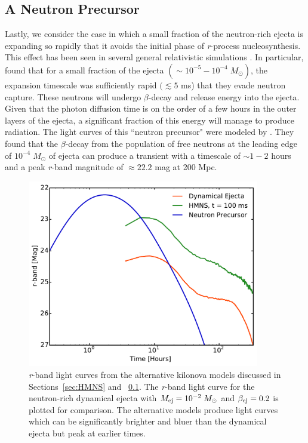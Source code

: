 \subsection{A Neutron Precursor}
\label{sec:neutronpre}
Lastly, we consider the case in which a small fraction of the neutron-rich ejecta is expanding so rapidly that it avoids the initial phase of {\em r}-process nucleosynthesis. This effect has been seen in several general relativistic simulations \citep{Bauswein+13b,Goriely+14,Just+14}. In particular, \citet{Bauswein+13b} found that for a small fraction of the ejecta $(\sim 10^{-5} - 10^{-4}\; M_{\odot})$, the expansion timescale was sufficiently rapid $(\lesssim 5$ ms) that they evade neutron capture. These neutrons will undergo $\beta$-decay and release energy into the ejecta. Given that the photon diffusion time is on the order of a few hours in the outer layers of the ejecta, a significant fraction of this energy will manage to produce radiation. The light curves of this ``neutron precursor" were modeled by \citet{Metzger+15}. They found that the $\beta$-decay from the population of free neutrons at the leading edge of $10^{-4}\;M_{\odot}$ of ejecta can produce a transient with a timescale of $\sim1-2$ hours and a peak {\em r}-band magnitude of $\approx 22.2$ mag at 200 Mpc.

\begin{figure}[h!]
\centering
\includegraphics[width=0.9\textwidth]{./figs/chapter2/ch2_f18.pdf}
\caption{{\em r}-band light curves from the alternative kilonova models discussed in Sections~\ref{sec:HMNS} and ~\ref{sec:neutronpre}. The {\em r}-band light curve for the neutron-rich dynamical ejecta with $M_{{\rm ej}} = 10^{-2}\;M_{\odot}$ and $\beta_{{\rm ej}} = 0.2$ is plotted for comparison. The alternative models produce light curves which can be significantly brighter and bluer than the dynamical ejecta but peak at earlier times.}
\label{fig:altLC}
\end{figure}
   
